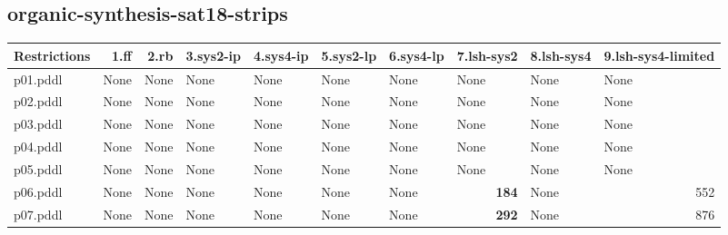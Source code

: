 \documentclass{article}
\begin{document}
\hypertarget{restrictions-organic-synthesis-sat18-strips}{}
\subsection*{organic-synthesis-sat18-strips}

\begin{tabular}{@{}lrrrrrrrrr@{}}
Restrictions & 1.ff & 2.rb & 3.sys2-ip & 4.sys4-ip & 5.sys2-lp & 6.sys4-lp & 7.lsh-sys2 & 8.lsh-sys4 & 9.lsh-sys4-limited \\
\midrule
p01.pddl & \multicolumn{1}{|l|}{None} & \multicolumn{1}{|l|}{None} & \multicolumn{1}{|l|}{None} & \multicolumn{1}{|l|}{None} & \multicolumn{1}{|l|}{None} & \multicolumn{1}{|l|}{None} & \multicolumn{1}{|l|}{None} & \multicolumn{1}{|l|}{None} & \multicolumn{1}{|l|}{None} \\
p02.pddl & \multicolumn{1}{|l|}{None} & \multicolumn{1}{|l|}{None} & \multicolumn{1}{|l|}{None} & \multicolumn{1}{|l|}{None} & \multicolumn{1}{|l|}{None} & \multicolumn{1}{|l|}{None} & \multicolumn{1}{|l|}{None} & \multicolumn{1}{|l|}{None} & \multicolumn{1}{|l|}{None} \\
p03.pddl & \multicolumn{1}{|l|}{None} & \multicolumn{1}{|l|}{None} & \multicolumn{1}{|l|}{None} & \multicolumn{1}{|l|}{None} & \multicolumn{1}{|l|}{None} & \multicolumn{1}{|l|}{None} & \multicolumn{1}{|l|}{None} & \multicolumn{1}{|l|}{None} & \multicolumn{1}{|l|}{None} \\
p04.pddl & \multicolumn{1}{|l|}{None} & \multicolumn{1}{|l|}{None} & \multicolumn{1}{|l|}{None} & \multicolumn{1}{|l|}{None} & \multicolumn{1}{|l|}{None} & \multicolumn{1}{|l|}{None} & \multicolumn{1}{|l|}{None} & \multicolumn{1}{|l|}{None} & \multicolumn{1}{|l|}{None} \\
p05.pddl & \multicolumn{1}{|l|}{None} & \multicolumn{1}{|l|}{None} & \multicolumn{1}{|l|}{None} & \multicolumn{1}{|l|}{None} & \multicolumn{1}{|l|}{None} & \multicolumn{1}{|l|}{None} & \multicolumn{1}{|l|}{None} & \multicolumn{1}{|l|}{None} & \multicolumn{1}{|l|}{None} \\
p06.pddl & \multicolumn{1}{|l|}{None} & \multicolumn{1}{|l|}{None} & \multicolumn{1}{|l|}{None} & \multicolumn{1}{|l|}{None} & \multicolumn{1}{|l|}{None} & \multicolumn{1}{|l|}{None} & \textbf{184} & \multicolumn{1}{|l|}{None} & 552 \\
p07.pddl & \multicolumn{1}{|l|}{None} & \multicolumn{1}{|l|}{None} & \multicolumn{1}{|l|}{None} & \multicolumn{1}{|l|}{None} & \multicolumn{1}{|l|}{None} & \multicolumn{1}{|l|}{None} & \textbf{292} & \multicolumn{1}{|l|}{None} & 876 \\

\end{tabular}
\end{document}
